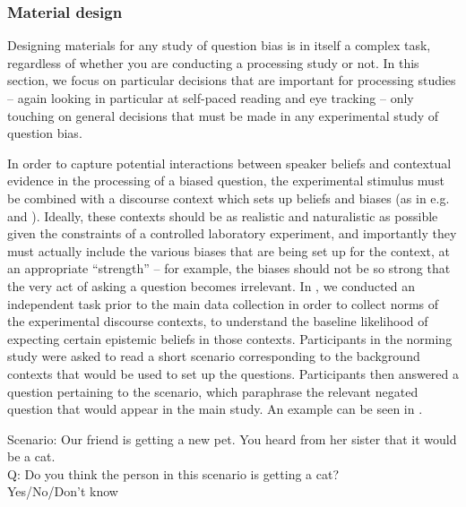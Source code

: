 \documentclass[output=paper,colorlinks,citecolor=brown]{langscibook}
\begin{document}
\subsubsection{Material design}

Designing materials for any study of question bias is in itself a complex task, regardless of whether you are conducting a processing study or not. In this section, we focus on particular decisions that are important for processing studies -- again looking in particular at self-paced reading and eye tracking -- only touching on general decisions that must be made in any experimental study of question bias.


In order to capture potential interactions between speaker beliefs and contextual evidence in the processing of a biased question, the experimental stimulus must be combined with a discourse context which sets up beliefs and biases (as in e.g.\ \citealt{domaneschi_bias_2017} and \citealt{macuch_processing_inprep}). Ideally, these contexts should be as realistic and naturalistic as possible given the constraints of a controlled laboratory experiment, and importantly they must actually include the various biases that are being set up for the context, at an appropriate ``strength'' -- for example, the biases should not be so strong that the very act of asking a question becomes irrelevant. In \citet{macuch_processing_inprep}, we conducted an independent task prior to the main data collection in order to collect norms of the experimental discourse contexts, to understand the baseline likelihood of expecting certain epistemic beliefs in those contexts. Participants in the norming study were asked to read a short scenario corresponding to the background contexts that would be used to set up the questions. Participants then answered a question pertaining to the scenario, which paraphrase the relevant negated question that would appear in the main study. An example can be seen in .

\begin{exe}
\ex \label{norming} Scenario: Our friend is getting a new pet. You heard from her sister that it would be a cat.\\ \textsc{Q}: Do you think the person in this scenario is getting a cat?\\ Yes/No/Don't know
\end{exe}
\end{document}
